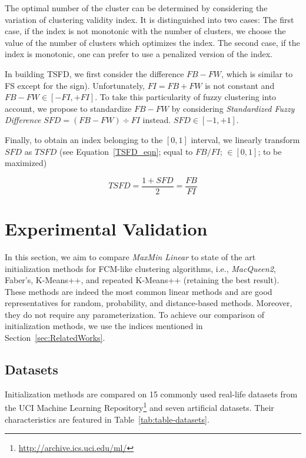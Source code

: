 \documentclass[runningheads,a4paper]{llncs}
\begin{document}
The optimal number of the cluster can be determined by considering the variation of clustering validity index. It is distinguished into two cases: The first case, if the index is not monotonic with the number of clusters, we choose the value of the number of clusters which optimizes the index. The second case, if the index is monotonic, one can prefer to use a penalized version of the index.

In building TSFD, we first consider the difference $FB - FW$, which is similar to FS except for the sign). Unfortunately, $FI = FB + FW$ is not constant and $FB - FW \in [-FI, +FI]$. To take this particularity of fuzzy clustering into account, we propose to standardize $FB - FW$ by considering \textit{Standardized Fuzzy Difference} $SFD = (FB - FW) \div FI$ instead. $SFD \in [-1, +1]$.

Finally, to obtain an index belonging to the $[0, 1]$ interval, we linearly transform $SFD$ as $TSFD$ (see Equation~\ref{TSFD_eqn}; equal to $FB/FI$; $\in [0, 1]$; to be maximized)

\begin{equation} \label{TSFD_eqn}
TSFD = \frac{1+SFD}{2} = \frac{FB}{FI} 
\end{equation}


\section{Experimental Validation}
\label{sec:Experiments}

In this section, we aim to compare \textit{MaxMin Linear} to state of the art initialization methods for FCM-like clustering algorithms, i.e., \textit{MacQueen2}, Faber's, K-Means++, and repeated K-Means++ (retaining the best result). These methods are indeed the most common linear methods and are good representatives for random, probability, and distance-based methods. Moreover, they do not require any parameterization. To achieve our comparison of initialization methods, we use the indices mentioned in  Section~\ref{sec:RelatedWorks}. 

\subsection{Datasets}
\label{subsec:ExperimentDatasets}

Initialization methods are compared on 15 commonly used real-life datasets from the UCI Machine Learning Repository\footnote{\url{http://archive.ics.uci.edu/ml/}} and seven artificial datasets. Their characteristics are featured in Table~\ref{tab:table-datasets}. 
\end{document}

